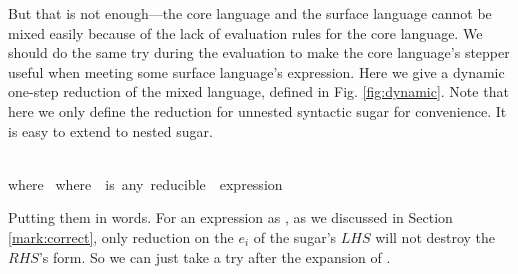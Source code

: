 But that is not enough---the core language and the surface language cannot be mixed easily because of the lack of evaluation rules for the core language. We should do the same try during the evaluation to make the core language's stepper useful when meeting some surface language's expression. Here we give a dynamic one-step reduction of the mixed language, defined in Fig. \ref{fig:dynamic}. Note that here we only define the reduction for unnested syntactic sugar for convenience. It is easy to extend to nested sugar.

\begin{figure*}[t]\small
{}
{}
{\\where~}
{}
{}
{}
\footnotesize{where~~is~any~reducible~~expression}
\caption{Dynamic Reduction}
\label{fig:dynamic}
\end{figure*}

Putting them in words. For an expression as , as we discussed in Section \ref{mark:correct}, only reduction on the $e_i$ of the sugar's $LHS$ will not destroy the $RHS$'s form. So we can just take a try after the expansion of .

